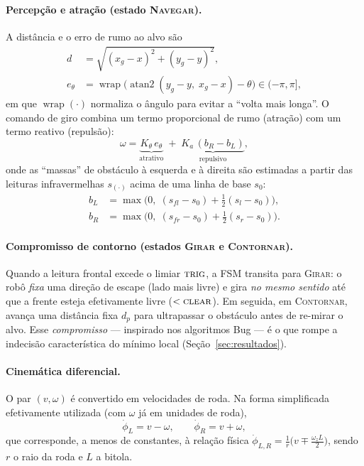 \documentclass[11pt,a4paper]{article}
\begin{document}
\paragraph{Percepção e atração (estado \textsc{Navegar}).}
A distância e o erro de rumo ao alvo são
\begin{align}
  d &= \sqrt{(x_g-x)^2 + (y_g-y)^2}, \\
  e_\theta &= \operatorname{wrap}\!\big(\operatorname{atan2}(y_g-y,\;x_g-x) - \theta\big) \in (-\pi,\pi],
\end{align}
em que $\operatorname{wrap}(\cdot)$ normaliza o ângulo para evitar a ``volta mais longa''. O comando de giro combina um termo proporcional de rumo (atração) com um termo reativo (repulsão):
\begin{equation}
  \omega = \underbrace{K_\theta\, e_\theta}_{\text{atrativo}} \;+\; \underbrace{K_a\,(b_R - b_L)}_{\text{repulsivo}},
  \label{eq:omega}
\end{equation}
onde as ``massas'' de obstáculo à esquerda e à direita são estimadas a partir das leituras infravermelhas $s_{(\cdot)}$ acima de uma linha de base $s_0$:
\begin{align}
  b_L &= \max\!\big(0,\;(s_{fl}-s_0) + \tfrac12 (s_{l}-s_0)\big), \\
  b_R &= \max\!\big(0,\;(s_{fr}-s_0) + \tfrac12 (s_{r}-s_0)\big).
\end{align}

\paragraph{Compromisso de contorno (estados \textsc{Girar} e \textsc{Contornar}).}
Quando a leitura frontal excede o limiar $\textsc{trig}$, a FSM transita para \textsc{Girar}: o robô \emph{fixa} uma direção de escape (lado mais livre) e gira \emph{no mesmo sentido} até que a frente esteja efetivamente livre ($< \textsc{clear}$). Em seguida, em \textsc{Contornar}, avança uma distância fixa $d_p$ para ultrapassar o obstáculo antes de re-mirar o alvo. Esse \emph{compromisso} --- inspirado nos algoritmos Bug \cite{lumelsky1987} --- é o que rompe a indecisão característica do mínimo local (Seção~\ref{sec:resultados}).

\paragraph{Cinemática diferencial.}
O par $(v,\omega)$ é convertido em velocidades de roda. Na forma simplificada efetivamente utilizada (com $\omega$ já em unidades de roda),
\begin{equation}
  \dot{\phi}_L = v - \omega, \qquad \dot{\phi}_R = v + \omega,
  \label{eq:diff}
\end{equation}
que corresponde, a menos de constantes, à relação física $\dot{\phi}_{L,R} = \tfrac{1}{r}\big(v \mp \tfrac{\omega_z L}{2}\big)$, sendo $r$ o raio da roda e $L$ a bitola.
\end{document}
